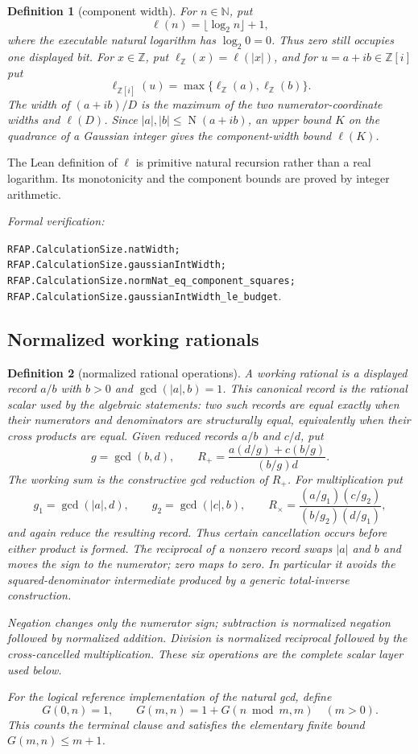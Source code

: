 \documentclass[11pt]{article}
\newtheorem{definition}[definition]{Definition}
\newcommand{\Zi}{\mathbb{Z}[i]}
\newcommand{\N}{\mathbb{N}}
\newcommand{\Z}{\mathbb{Z}}
\newcommand{\Norm}[1]{\operatorname{N}\!\left(#1\right)}
\newcommand{\leanref}[1]{\par\smallskip\noindent
  \emph{Formal verification:}\par\nobreak
  {\raggedright\nolinkurl{#1}.\par}}
\begin{document}
\begin{definition}[component width]
\label{def:component-width}
For $n\in\N$, put
\[
                 \ell(n)=\lfloor\log_2n\rfloor+1,
\]
where the executable natural logarithm has $\log_2 0=0$.  Thus zero still
occupies one displayed bit.  For $x\in\Z$, put
$\ell_{\Z}(x)=\ell(|x|)$, and for $u=a+ib\in\Zi$ put
\[
                 \ell_{\Zi}(u)=\max\{\ell_{\Z}(a),\ell_{\Z}(b)\}.
\]
The width of $(a+ib)/D$ is the maximum of the two numerator-coordinate widths
and $\ell(D)$.  Since $|a|,|b|\le\Norm{a+ib}$, an upper bound $K$ on the
quadrance of a Gaussian integer gives the component-width bound $\ell(K)$.
\end{definition}

The Lean definition of $\ell$ is primitive natural recursion rather than a
real logarithm.  Its monotonicity and the component bounds are proved by
integer arithmetic.

\leanref{RFAP.CalculationSize.natWidth;
RFAP.CalculationSize.gaussianIntWidth;
RFAP.CalculationSize.normNat_eq_component_squares;
RFAP.CalculationSize.gaussianIntWidth_le_budget}

\subsection{Normalized working rationals}

\begin{definition}[normalized rational operations]
\label{def:normalized-rational-operations}
A working rational is a displayed record $a/b$ with $b>0$ and
$\gcd(|a|,b)=1$.  This canonical record is the rational scalar used by the
algebraic statements: two such records are equal exactly when their
numerators and denominators are structurally equal, equivalently when their
cross products are equal.  Given reduced records $a/b$ and $c/d$, put
\[
 g=\gcd(b,d),\qquad
 R_+=\frac{a(d/g)+c(b/g)}{(b/g)d}.
\]
The working sum is the constructive gcd reduction of $R_+$.  For
multiplication put
\[
 g_1=\gcd(|a|,d),\qquad g_2=\gcd(|c|,b),\qquad
 R_\times=\frac{(a/g_1)(c/g_2)}{(b/g_2)(d/g_1)},
\]
and again reduce the resulting record.  Thus certain cancellation occurs
before either product is formed.  The reciprocal of a nonzero record swaps
$|a|$ and $b$ and moves the sign to the numerator; zero maps to zero.  In
particular it avoids the squared-denominator intermediate produced by a
generic total-inverse construction.

Negation changes only the numerator sign; subtraction is normalized
negation followed by normalized addition.  Division is normalized reciprocal
followed by the cross-cancelled multiplication.  These six operations are
the complete scalar layer used below.

For the logical reference implementation of the natural gcd, define
\[
 G(0,n)=1,\qquad G(m,n)=1+G(n\bmod m,m)\quad(m>0).
\]
This counts the terminal clause and satisfies the elementary finite bound
$G(m,n)\le m+1$.
\end{definition}
\end{document}
